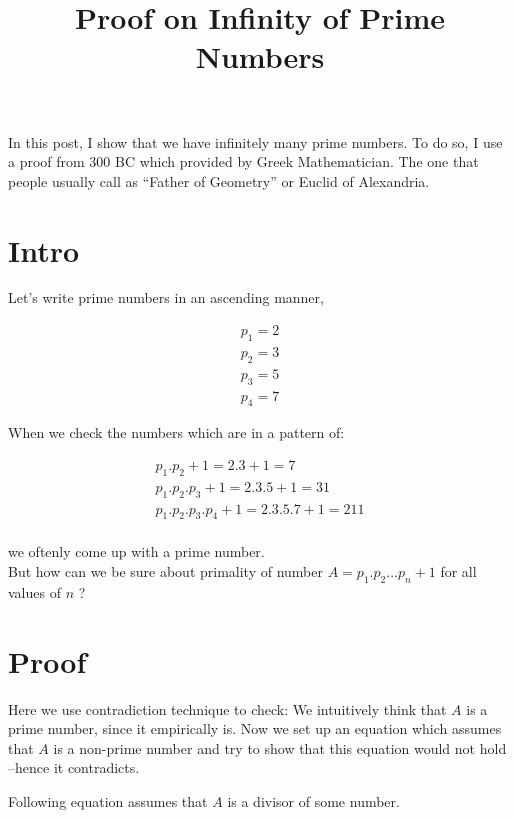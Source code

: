 \documentclass[11pt]{article}
\title{\textbf{Proof on Infinity of Prime Numbers}}
\date{}
\begin{document}
\maketitle

In this post, I show that we have infinitely many prime numbers. To do so, I use a proof from 300 BC which provided by Greek Mathematician. The one that people usually call as “Father of Geometry” or Euclid of Alexandria. 

\section{Intro}

Let's write prime numbers in an ascending manner,

\begin{equation}
\begin{split}
p_1 = 2 \\
p_2 = 3 \\
p_3 = 5  \\
 p_4 = 7
\end{split}
\end{equation}

When we check the numbers which are in a pattern of: 

\begin{equation}
\begin{split}
p_1.p_2 + 1 = 2.3 + 1 = 7 \\
 p_1.p_2.p_3 + 1 = 2.3.5 + 1 = 31 \\
p_1.p_2.p_3.p_4 + 1 = 2.3.5.7 + 1 = 211 \\
\end{split}
\end{equation}

we oftenly come up with a prime number.\\

But how can we be sure about primality of number $A = p_1.p_2 \dots p_n + 1$ for all values of $n$ ? 

\section{Proof}
Here we use contradiction technique to check: We intuitively think that $A$ is a prime number, since it empirically is. Now we set up an equation which assumes that $A$ is a non-prime number and try to show that this equation would not hold --hence it contradicts.

Following equation assumes that $A$ is a divisor of some number. \\
\end{document}
